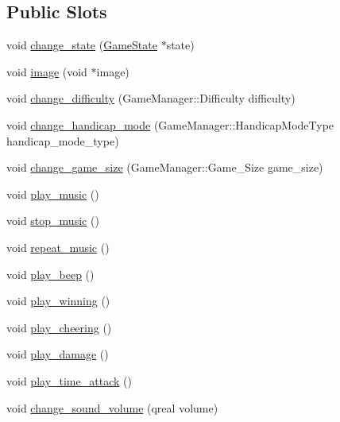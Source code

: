 \subsection*{Public Slots}
\begin{DoxyCompactItemize}
\item 
void \hyperlink{class_game_manager_a60d891c730d679638699313b32554fc3}{change\-\_\-state} (\hyperlink{class_game_state}{Game\-State} $\ast$state)
\item 
void \hyperlink{class_game_manager_a95f0287ced8a2bc8d27fb5ec1a65eff2}{image} (void $\ast$image)
\item 
void \hyperlink{class_game_manager_ae9c52fcc0f8b739437a552766d46ba17}{change\-\_\-difficulty} (Game\-Manager\-::\-Difficulty difficulty)
\item 
void \hyperlink{class_game_manager_a8a5d97b0e6ed557b7f69940bb0952512}{change\-\_\-handicap\-\_\-mode} (Game\-Manager\-::\-Handicap\-Mode\-Type handicap\-\_\-mode\-\_\-type)
\item 
void \hyperlink{class_game_manager_a3d3dc17dd64dc88b0dafde6242ff2a7f}{change\-\_\-game\-\_\-size} (Game\-Manager\-::\-Game\-\_\-\-Size game\-\_\-size)
\item 
void \hyperlink{class_game_manager_aa67acf06c1d17c7d619e7f3b5f66aa94}{play\-\_\-music} ()
\item 
void \hyperlink{class_game_manager_a1e2882956f8a8e5d37757a4507920400}{stop\-\_\-music} ()
\item 
void \hyperlink{class_game_manager_ab98d663d42b1d38797b083b6b3933df1}{repeat\-\_\-music} ()
\item 
void \hyperlink{class_game_manager_a80a390ee9cdb8edd93762700a1833776}{play\-\_\-beep} ()
\item 
void \hyperlink{class_game_manager_a0be5977321be835e23bef58bdfe168f7}{play\-\_\-winning} ()
\item 
void \hyperlink{class_game_manager_abbbdd9d7c28c56e3ba23a12a086c93ef}{play\-\_\-cheering} ()
\item 
void \hyperlink{class_game_manager_a6ca31624d3696c340dfdcd3ce05d6c62}{play\-\_\-damage} ()
\item 
void \hyperlink{class_game_manager_a109f726ba3615064cab23747e8770951}{play\-\_\-time\-\_\-attack} ()
\item 
void \hyperlink{class_game_manager_a43614bc8737a3b12e7b0c189bf6dd5ab}{change\-\_\-sound\-\_\-volume} (qreal volume)
\end{DoxyCompactItemize}
